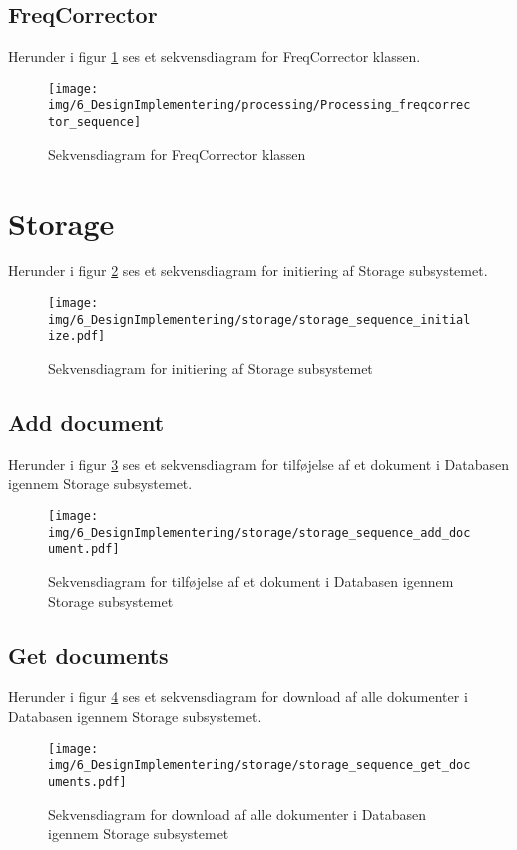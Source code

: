 \begin{appendices}
\subsection{FreqCorrector}
Herunder i figur \ref{fig:FreqCorrector_sequence} ses et sekvensdiagram for FreqCorrector klassen.
\begin{figure}[H]
	\centering
	\texttt{[image: img/6\_DesignImplementering/processing/Processing\_freqcorrector\_sequence]}
	\caption{Sekvensdiagram for FreqCorrector klassen}
	\label{fig:FreqCorrector_sequence}
\end{figure}

\pagebreak

\section{Storage}

Herunder i figur \ref{fig:Storage_sequence} ses et sekvensdiagram for initiering af Storage subsystemet.
\begin{figure}[H]
	\centering
	\texttt{[image: img/6\_DesignImplementering/storage/storage\_sequence\_initialize.pdf]}
	\caption{Sekvensdiagram for initiering af Storage subsystemet}
	\label{fig:Storage_sequence}
\end{figure}

\pagebreak
\subsection{Add document}

Herunder i figur \ref{fig:Storage_add_document_sequence} ses et sekvensdiagram for tilføjelse af et dokument i Databasen igennem Storage subsystemet.
\begin{figure}[H]
	\centering
	\texttt{[image: img/6\_DesignImplementering/storage/storage\_sequence\_add\_document.pdf]}
	\caption[Sekvensdiagram for Add document]{Sekvensdiagram for tilføjelse af et dokument i Databasen igennem Storage subsystemet}
	\label{fig:Storage_add_document_sequence}
\end{figure}

\pagebreak
\subsection{Get documents}

Herunder i figur \ref{fig:Storage_get_documents_sequence} ses et sekvensdiagram for download af alle dokumenter i Databasen igennem Storage subsystemet.
\begin{figure}[H]
	\centering
	\texttt{[image: img/6\_DesignImplementering/storage/storage\_sequence\_get\_documents.pdf]}
	\caption[Sekvensdiagram for Get documents]{Sekvensdiagram for download af alle dokumenter i Databasen igennem Storage subsystemet}
	\label{fig:Storage_get_documents_sequence}
\end{figure}


\end{appendices}
